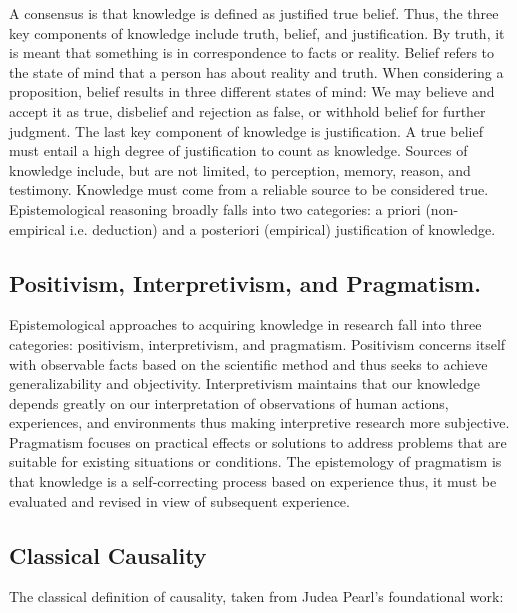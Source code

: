 \documentclass{article}
\begin{document}
A consensus is that knowledge is defined as justified true belief. Thus, the three key components of knowledge include truth, belief, and justification. By truth, it is meant that something is in correspondence to facts or reality. Belief refers to the state of mind that a person has about reality and truth\cite{sol2022understanding}.
When considering a proposition, belief results in three different states of mind: We may believe and accept it as true, disbelief and rejection as false, or withhold belief for further judgment. The last key component of knowledge is justification.
A true belief must entail a high degree of justification to count as knowledge. Sources of knowledge include, but are not limited, to perception, memory, reason, and testimony. Knowledge must come from a reliable source to be considered true. Epistemological reasoning broadly falls into two categories: a priori (non-empirical i.e. deduction) and a posteriori (empirical) justification of knowledge\cite{sol2022understanding}.


\subsection{Positivism, Interpretivism, and Pragmatism.}
\label{subsec:Def_Positivism}

Epistemological approaches to acquiring knowledge in research fall into three categories: positivism, interpretivism, and pragmatism. Positivism concerns itself with observable facts based on the scientific method and thus seeks to achieve generalizability and objectivity. Interpretivism maintains that our knowledge depends greatly on our interpretation of observations of human actions, experiences, and environments thus making interpretive research more subjective. Pragmatism focuses on practical effects or solutions to address problems that are suitable for existing situations or conditions. The epistemology of pragmatism is that knowledge is a self-correcting process based on experience thus, it must be evaluated and revised in view of subsequent experience\cite{sol2022understanding}.

\subsection{Classical Causality}
\label{subsec:Classical_Causality}

The classical definition of causality, taken from Judea Pearl's foundational work\cite{pearl2009causality}:
\end{document}
